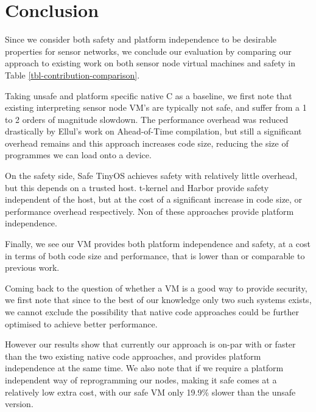 \section{Conclusion}


Since we consider both safety and platform independence to be desirable properties for sensor networks, we conclude our evaluation by comparing our approach to existing work on both sensor node virtual machines and safety in Table \ref{tbl-contribution-comparison}.

Taking unsafe and platform specific native C as a baseline, we first note that existing interpreting sensor node VM's are typically not safe, and suffer from a 1 to 2 orders of magnitude slowdown. The performance overhead was reduced drastically by Ellul's work on Ahead-of-Time compilation, but still a significant overhead remains and this approach increases code size, reducing the size of programmes we can load onto a device.

On the safety side, Safe TinyOS achieves safety with relatively little overhead, but this depends on a trusted host. t-kernel and Harbor provide safety independent of the host, but at the cost of a significant increase in code size, or performance overhead respectively. Non of these approaches provide platform independence.

Finally, we see our VM provides both platform independence and safety, at a cost in terms of both code size and performance, that is lower than or comparable to previous work.

Coming back to the question of whether a VM is a good way to provide security, we first note that since to the best of our knowledge only two such systems exists, we cannot exclude the possibility that native code approaches could be further optimised to achieve better performance.

However our results show that currently our approach is on-par with or faster than the two existing native code approaches, and provides platform independence at the same time. We also note that if we require a platform independent way of reprogramming our nodes, making it safe comes at a relatively low extra cost, with our safe VM only 19.9\% slower than the unsafe version.